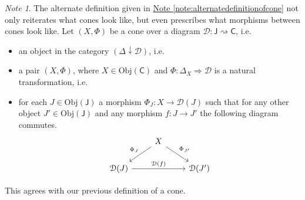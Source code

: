 \documentclass[a4paper,10pt]{scrreprt}
\newcommand{\Obj}{\mathrm{Obj}}
\theoremstyle{definition}
\theoremstyle{plain}
\theoremstyle{remark}
\newtheorem{note}{Note}[section]
\begin{document}
\begin{note}
  The alternate definition given in \hyperref[note:alternatedefinitionofcone]{Note \ref*{note:alternatedefinitionofcone}} not only reiterates what cones look like, but even prescribes what morphisms between cones look like. Let $(X, \Phi)$ be a cone over a diagram $\mathcal{D}\colon \mathsf{J} \rightsquigarrow \mathsf{C}$, i.e.
  \begin{itemize}
    \item an object in the category $(\Delta \downarrow \mathcal{D})$, i.e.
    \item a pair $(X, \Phi)$, where $X \in \Obj(\mathsf{C})$ and $\Phi\colon \Delta_{X} \Rightarrow \mathcal{D}$ is a natural transformation, i.e.
    \item for each $J \in \Obj(\mathsf{J})$ a morphism $\Phi_{J}\colon X \to \mathcal{D}(J)$ such that for any other object $J' \in \Obj(\mathsf{J})$ and any morphism $f\colon J \to J'$ the following diagram commutes.
      \begin{equation*}
        \begin{tikzcd}
          & X
          \arrow[ld, swap, "\Phi_{J}"]
          \arrow[rd, "\Phi_{J'}"]
          \\
          \mathcal{D}(J)
          \arrow[rr, "\mathcal{D}(f)"]
          & & \mathcal{D}(J')
        \end{tikzcd}
      \end{equation*}
  \end{itemize}
  This agrees with our previous definition of a cone.


\end{note}
\end{document}
